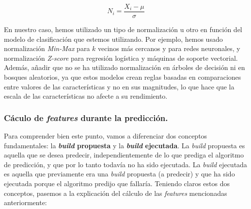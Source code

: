 \begin{itemize}
\begin{enumerate}
        \begin{equation}
            N_{i} = \frac{X_{i} - \mu}{\sigma}
        \end{equation}
    \end{enumerate}

    En nuestro caso, hemos utilizado un tipo de normalización u otro en función del modelo de
    clasificación que estemos utilizando. Por ejemplo, hemos usado normalización \textit{Min-Max}
    para $k$ vecinos más cercanos y para redes neuronales, y normalización \textit{Z-score} para
    regresión logística y máquinas de soporte vectorial. Además, añadir que no se ha utilizado
    normalización en árboles de decisión ni en bosques aleatorios, ya que estos modelos crean
    reglas basadas en comparaciones entre valores de las características y no en sus magnitudes,
    lo que hace que la escala de las características no afecte a su rendimiento.
\end{itemize}

\subsubsection{Cáculo de \textit{features} durante la predicción.} Para comprender bien este
punto, vamos a diferenciar dos conceptos fundamentales: la \textbf{\textit{build} propuesta} y la
\textbf{\textit{build} ejecutada}. La \textit{build} propuesta es aquella que se desea predecir,
independientemente de lo que prediga el algoritmo de predicción, y que por lo tanto todavía no ha
sido ejecutada. La \textit{build} ejecutada es aquella que previamente era una \textit{build}
propuesta (a predecir) y que ha sido ejecutada porque el algoritmo predijo que fallaría. Teniendo
claros estos dos conceptos, pasemos a la explicación del cálculo de las \textit{features}
mencionadas anteriormente:

